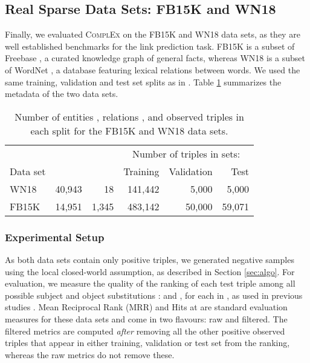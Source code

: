 \documentclass[twoside,11pt]{article}
\renewcommand{\cite}{\citep}
\begin{document}
\subsection{Real Sparse Data Sets: FB15K and WN18}


Finally, we evaluated \textsc{ComplEx} on the FB15K and WN18 data sets, as they are well 
established benchmarks for the link prediction task. 
FB15K is a subset of Freebase \cite{Bollacker2008}, a curated knowledge graph of general facts, whereas WN18 is a subset of WordNet \cite{fellbaum1998wordnet}, a database featuring lexical relations between words.  We used the same training, validation and test set splits as in \citet{bordes2013translating}. Table \ref{tab:fb15k_wn18_meta} summarizes the metadata of the two data sets.

\begin{table}[t]
    \centering
    \begin{tabular}{l|rrrrr}
        & & & \multicolumn{3}{c}{Number of triples in sets:} \\
        Data set &  &  & Training & Validation & Test\\ \hline
        WN18 & 40,943 & 18 & 141,442 & 5,000 & 5,000 \\
        FB15K & 14,951 & 1,345 & 483,142 & 50,000 & 59,071 \\
    \end{tabular}
    \caption{Number of entities , relations , and observed triples in each split for the FB15K and WN18 data sets.}
    \label{tab:fb15k_wn18_meta}
\end{table}


\subsubsection{Experimental Setup}

As both data sets contain only positive triples, we generated negative samples
using the local closed-world assumption, as described in Section
\ref{sec:algo}. For evaluation, we measure the quality of the ranking of each test triple among all possible subject and object substitutions
:  and , for each  in , as used in previous studies \cite{bordes2013translating,nickel_2016_holographic}.
 Mean Reciprocal Rank (MRR) and Hits at  are standard evaluation measures for these data sets and come in two flavours: raw and filtered. The filtered metrics are computed \emph{after} removing all the other positive observed triples that appear in either training, validation or test set from the ranking, whereas the raw metrics do not remove these. 
\end{document}
